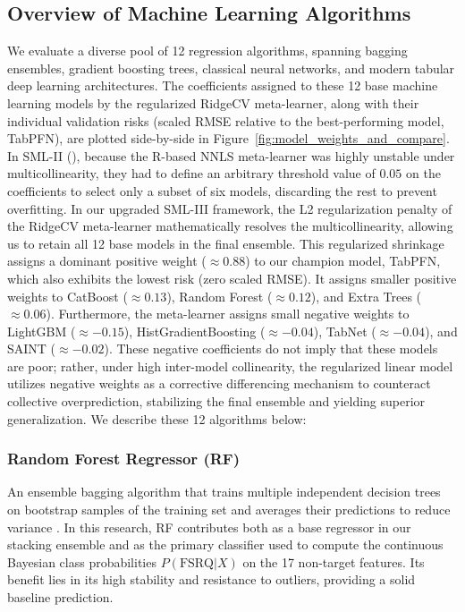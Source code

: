 \documentclass[twocolumn,linenumbers,floatfix]{aastex701}
\begin{document}
\subsection{Overview of Machine Learning Algorithms}
\label{sec:ml_overview}
We evaluate a diverse pool of 12 regression algorithms, spanning bagging ensembles, gradient boosting trees, classical neural networks, and modern tabular deep learning architectures. The coefficients assigned to these 12 base machine learning models by the regularized RidgeCV meta-learner, along with their individual validation risks (scaled RMSE relative to the best-performing model, TabPFN), are plotted side-by-side in Figure~\ref{fig:model_weights_and_compare}. In SML-II (\citealt{Narendra2022}), because the R-based NNLS meta-learner was highly unstable under multicollinearity, they had to define an arbitrary threshold value of $0.05$ on the coefficients to select only a subset of six models, discarding the rest to prevent overfitting. In our upgraded SML-III framework, the L2 regularization penalty of the RidgeCV meta-learner mathematically resolves the multicollinearity, allowing us to retain all 12 base models in the final ensemble. This regularized shrinkage assigns a dominant positive weight ($\approx 0.88$) to our champion model, TabPFN, which also exhibits the lowest risk (zero scaled RMSE). It assigns smaller positive weights to CatBoost ($\approx 0.13$), Random Forest ($\approx 0.12$), and Extra Trees ($\approx 0.06$). Furthermore, the meta-learner assigns small negative weights to LightGBM ($\approx -0.15$), HistGradientBoosting ($\approx -0.04$), TabNet ($\approx -0.04$), and SAINT ($\approx -0.02$). These negative coefficients do not imply that these models are poor; rather, under high inter-model collinearity, the regularized linear model utilizes negative weights as a corrective differencing mechanism to counteract collective overprediction, stabilizing the final ensemble and yielding superior generalization. We describe these 12 algorithms below:

\subsubsection{Random Forest Regressor (RF)}
An ensemble bagging algorithm that trains multiple independent decision trees on bootstrap samples of the training set and averages their predictions to reduce variance \citep{Breiman2001}. In this research, RF contributes both as a base regressor in our stacking ensemble and as the primary classifier used to compute the continuous Bayesian class probabilities $P(\text{FSRQ} | X)$ on the 17 non-target features. Its benefit lies in its high stability and resistance to outliers, providing a solid baseline prediction.
\end{document}
